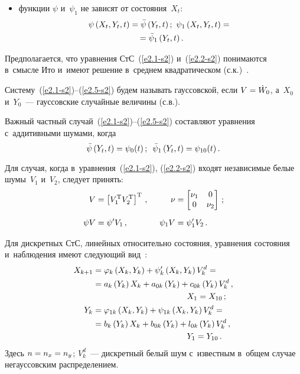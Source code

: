 \begin{multicols}{2}
\begin{itemize}
\item функции $\psi$ и~$\psi_1$  не зависят от состояния~$X_t$:
\begin{multline}
\hspace*{-1pt}\psi \left(X_t, Y_t, t\right) = \bar\psi \left(Y_t, t\right) ;\  
\psi_1 \left(X_t, Y_t, t\right) ={}\\
{}= \bar\psi_1  \left(Y_t, t\right).
\label{e2.5-s2}
\end{multline}
    \end{itemize}

Предполагается, что уравнения СтС~(\ref{e2.1-s2}) и~(\ref{e2.2-s2}) 
понимаются в~смысле Ито и~имеют решение в~среднем квадратическом (с.к.)~\cite{3-s2}.

Систему~(\ref{e2.1-s2})--(\ref{e2.5-s2}) будем называть гауссовской, 
если  $V\hm=\dot W_0$, а~$X_0$ и~$Y_0$~--- гауссовские случайные величины (с.в.).

Важный частный случай~(\ref{e2.1-s2})--(\ref{e2.5-s2}) 
составляют уравнения с~аддитивными шумами, когда
 \begin{equation}
 \bar\psi\left(Y_t, t\right) = \psi_0 (t)\,;\enskip 
 \bar\psi_1 \left(Y_t, t\right) = \psi_{10} (t)\,.
 \label{e2.6-s2}
 \end{equation}

Для случая, когда в~уравнения~(\ref{e2.1-s2}), (\ref{e2.2-s2}) 
входят независимые белые шумы~$V_1$ и~$V_2$, следует принять:
 \begin{alignat*}{2}
 V&= \displaystyle\lk V_1^{\mathrm{T}} V_2^{\mathrm{T}}\rk^{\mathrm{T}}\,,&\enskip 
 \nu&=\begin{bmatrix}
    \nu_1&0\\
    0&\nu_2\end{bmatrix}\,;\\[6pt] 
    \psi V &=\psi' V_1\,,&\enskip \psi_1 V &= \psi_1' V_2\,.
    \end{alignat*}

Для дискретных СтС, линейных относительно состояния, уравнения состояния и~наблюдения 
имеют следующий вид~\cite{3-s2}:
\begin{align}
X_{k+1}&=\vrp_k \left(X_k, Y_k\right)+ \psi_k' \left(X_k, Y_k\right) V_{k}^d= {}\notag\\
&{}=a_k \left(Y_k\right)X_k + a_{0k} \left(Y_k\right) + c_{0k}\left(Y_k\right)  
V_{k}^d\,,\notag\\ 
&\hspace*{40mm}X_1 = X_{10}\,;\label{e2.8-s2}\\
Y_{k}&=\vrp_{1k} \left(X_k, Y_k\right)+ \psi_{1k} \left(X_k, Y_k\right) V_{k}^d={}\notag\\ 
&{}=b_k \left(Y_k\right)X_k + b_{0k} \left(Y_k\right) + l_{0k} \left(Y_k\right) 
 V_{k}^d\,,\notag\\
 & \hspace*{40mm}Y_1 = Y_{10}\,.\label{e2.9-s2}
 \end{align}
Здесь $n=n_x\hm=n_y$; $V_k^d$~--- дискретный белый шум с~известным 
в~общем случае негауссовским распределением.


\end{multicols}
